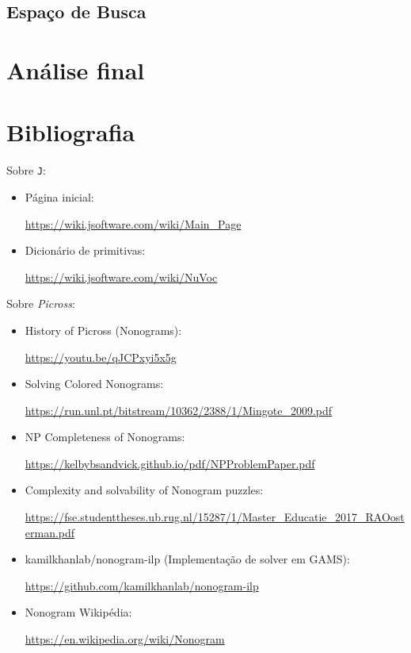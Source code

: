 \documentclass{article}
\newcommand{\lang}{\texttt{J}}
\begin{document}
\subsection{Espaço de Busca}

\section{Análise final}

\section{Bibliografia}

Sobre \lang{}:
\begin{itemize}
    \item Página inicial: \par
        \url{https://wiki.jsoftware.com/wiki/Main_Page}
    \item Dicionário de primitivas: \par
        \url{https://wiki.jsoftware.com/wiki/NuVoc}
\end{itemize}

Sobre \emph{Picross}:
\begin{itemize}
    \item History of Picross (Nonograms): \par
        \url{https://youtu.be/qJCPxyi5x5g}
    \item Solving Colored Nonograms: \par
        \url{https://run.unl.pt/bitstream/10362/2388/1/Mingote_2009.pdf}
    \item NP Completeness of Nonograms: \par
        \url{https://kelbybsandvick.github.io/pdf/NPProblemPaper.pdf}
    \item Complexity and solvability of Nonogram puzzles: \par
        \url{https://fse.studenttheses.ub.rug.nl/15287/1/Master_Educatie_2017_RAOosterman.pdf}
    \item kamilkhanlab/nonogram-ilp
        (Implementação de solver em GAMS): \par
        \url{https://github.com/kamilkhanlab/nonogram-ilp}
    \item Nonogram Wikipédia: \par
        \url{https://en.wikipedia.org/wiki/Nonogram}
\end{itemize}
\end{document}
